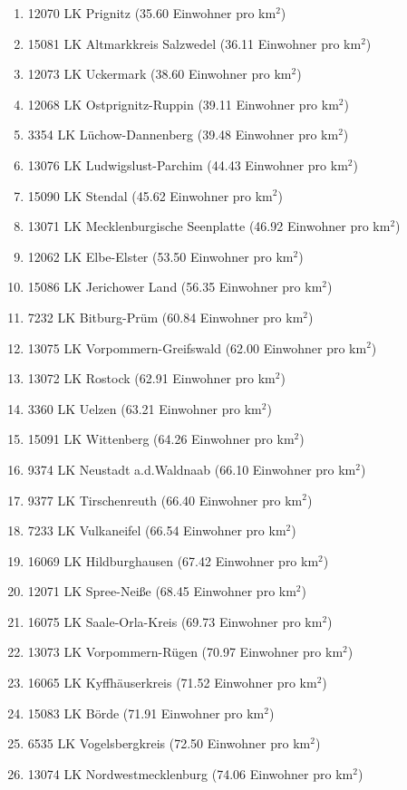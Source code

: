 \begin{enumerate}[itemsep=-6mm]
\item 12070 LK Prignitz (35.60 Einwohner pro km$^2$)
\item 15081 LK Altmarkkreis Salzwedel (36.11 Einwohner pro km$^2$)
\item 12073 LK Uckermark (38.60 Einwohner pro km$^2$)
\item 12068 LK Ostprignitz-Ruppin (39.11 Einwohner pro km$^2$)
\item 3354 LK Lüchow-Dannenberg (39.48 Einwohner pro km$^2$)
\item 13076 LK Ludwigslust-Parchim (44.43 Einwohner pro km$^2$)
\item 15090 LK Stendal (45.62 Einwohner pro km$^2$)
\item 13071 LK Mecklenburgische Seenplatte (46.92 Einwohner pro km$^2$)
\item 12062 LK Elbe-Elster (53.50 Einwohner pro km$^2$)
\item 15086 LK Jerichower Land (56.35 Einwohner pro km$^2$)
\item 7232 LK Bitburg-Prüm (60.84 Einwohner pro km$^2$)
\item 13075 LK Vorpommern-Greifswald (62.00 Einwohner pro km$^2$)
\item 13072 LK Rostock (62.91 Einwohner pro km$^2$)
\item 3360 LK Uelzen (63.21 Einwohner pro km$^2$)
\item 15091 LK Wittenberg (64.26 Einwohner pro km$^2$)
\item 9374 LK Neustadt a.d.Waldnaab (66.10 Einwohner pro km$^2$)
\item 9377 LK Tirschenreuth (66.40 Einwohner pro km$^2$)
\item 7233 LK Vulkaneifel (66.54 Einwohner pro km$^2$)
\item 16069 LK Hildburghausen (67.42 Einwohner pro km$^2$)
\item 12071 LK Spree-Neiße (68.45 Einwohner pro km$^2$)
\item 16075 LK Saale-Orla-Kreis (69.73 Einwohner pro km$^2$)
\item 13073 LK Vorpommern-Rügen (70.97 Einwohner pro km$^2$)
\item 16065 LK Kyffhäuserkreis (71.52 Einwohner pro km$^2$)
\item 15083 LK Börde (71.91 Einwohner pro km$^2$)
\item 6535 LK Vogelsbergkreis (72.50 Einwohner pro km$^2$)
\item 13074 LK Nordwestmecklenburg (74.06 Einwohner pro km$^2$)

\end{enumerate}
